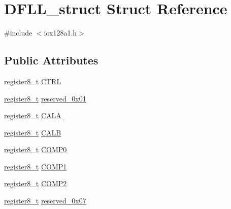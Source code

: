\hypertarget{struct_d_f_l_l__struct}{
\section{DFLL\_\-struct Struct Reference}
\label{struct_d_f_l_l__struct}
}


{\ttfamily \#include $<$iox128a1.h$>$}

\subsection*{Public Attributes}
\begin{DoxyCompactItemize}
\item 
\hyperlink{iox128a1_8h_a6a0649252b392263406882923b04a9db}{register8\_\-t} \hyperlink{struct_d_f_l_l__struct_af2e5686437264ad16c39ffa2d3ed46e0}{CTRL}
\item 
\hyperlink{iox128a1_8h_a6a0649252b392263406882923b04a9db}{register8\_\-t} \hyperlink{struct_d_f_l_l__struct_a3eb4a54008db96917e095a177c94eb1d}{reserved\_\-0x01}
\item 
\hyperlink{iox128a1_8h_a6a0649252b392263406882923b04a9db}{register8\_\-t} \hyperlink{struct_d_f_l_l__struct_ae3b0088249723a12f6b94f12f27da2bf}{CALA}
\item 
\hyperlink{iox128a1_8h_a6a0649252b392263406882923b04a9db}{register8\_\-t} \hyperlink{struct_d_f_l_l__struct_a3b301c9e72d1a898cf43de28c05c4924}{CALB}
\item 
\hyperlink{iox128a1_8h_a6a0649252b392263406882923b04a9db}{register8\_\-t} \hyperlink{struct_d_f_l_l__struct_a204664b2ce7db1102501ac95ef627c20}{COMP0}
\item 
\hyperlink{iox128a1_8h_a6a0649252b392263406882923b04a9db}{register8\_\-t} \hyperlink{struct_d_f_l_l__struct_a36cead723e87ed911a4694174cbdaf8d}{COMP1}
\item 
\hyperlink{iox128a1_8h_a6a0649252b392263406882923b04a9db}{register8\_\-t} \hyperlink{struct_d_f_l_l__struct_adca6783bcb9f4ffeb729efba3a6b0213}{COMP2}
\item 
\hyperlink{iox128a1_8h_a6a0649252b392263406882923b04a9db}{register8\_\-t} \hyperlink{struct_d_f_l_l__struct_afb05d17c581ed91bc7755b03fa4d722a}{reserved\_\-0x07}
\end{DoxyCompactItemize}


